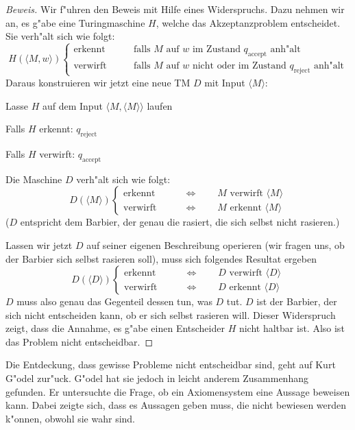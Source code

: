 \begin{proof}[Beweis]
Wir f"uhren den Beweis mit Hilfe eines Widerspruchs. Dazu nehmen wir
an, es g"abe eine Turingmaschine $H$, welche das Akzeptanzproblem entscheidet.
Sie verh"alt sich wie folgt:
\[
H(\langle M,w\rangle)\begin{cases}
\text{erkennt}&\qquad\text{falls $M$ auf $w$ im Zustand $q_{\text{accept}}$ anh"alt}
\\
\text{verwirft}&\qquad\text{falls $M$ auf $w$ nicht oder im Zustand $q_{\text{reject}}$ anh"alt}
\end{cases}
\]
Daraus konstruieren wir jetzt eine neue TM $D$ mit Input $\langle M\rangle$:
\medskip
\begin{compactenum}
\item Lasse $H$ auf dem Input $\langle M,\langle M\rangle\rangle$ laufen
\item Falls $H$ erkennt: $q_{\text{reject}}$
\item Falls $H$ verwirft: $q_{\text{accept}}$
\end{compactenum}
\medskip
Die Maschine $D$ verh"alt sich wie folgt:
\[
D(\langle M\rangle)\begin{cases}
\text{erkennt}&\qquad\Leftrightarrow\qquad \text{$M$ verwirft $\langle M\rangle$}
\\
\text{verwirft}&\qquad\Leftrightarrow\qquad \text{$M$ erkennt $\langle M\rangle$}
\end{cases}
\]
($D$ entspricht dem Barbier, der genau die rasiert, die sich selbst
nicht rasieren.)

Lassen wir jetzt $D$ auf seiner eigenen Beschreibung operieren
(wir fragen uns, ob der Barbier sich selbst rasieren soll), muss
sich folgendes Resultat ergeben
\[
D(\langle D\rangle)\begin{cases}
\text{erkennt}&\qquad\Leftrightarrow\qquad \text{$D$ verwirft $\langle D\rangle$}
\\
\text{verwirft}&\qquad\Leftrightarrow\qquad \text{$D$ erkennt $\langle D\rangle$}
\end{cases}
\]
$D$ muss also genau das Gegenteil dessen tun, was $D$ tut.
$D$ ist der Barbier, der sich nicht entscheiden kann, ob er sich selbst
rasieren will.
Dieser
Widerspruch zeigt, dass die Annahme, es g"abe einen Entscheider $H$
nicht haltbar ist. Also ist das Problem nicht entscheidbar.
\end{proof}

Die Entdeckung, dass gewisse Probleme nicht entscheidbar sind,
geht auf Kurt G"odel zur"uck. G"odel hat sie jedoch in leicht
anderem Zusammenhang gefunden. Er untersuchte die Frage, ob ein
Axiomensystem eine Aussage beweisen kann. Dabei zeigte sich,
dass es Aussagen geben muss, die nicht bewiesen werden k"onnen,
obwohl sie wahr sind.

